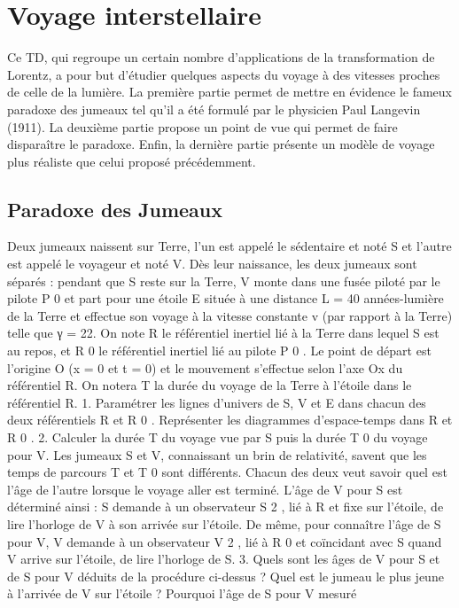 \section{Voyage interstellaire}

Ce TD, qui regroupe un certain nombre d’applications de la transformation de Lorentz, a
pour but d’étudier quelques aspects du voyage à des vitesses proches de celle de la lumière. La
première partie permet de mettre en évidence le fameux paradoxe des jumeaux tel qu’il a été
formulé par le physicien Paul Langevin (1911). La deuxième partie propose un point de vue qui
permet de faire disparaître le paradoxe. Enfin, la dernière partie présente un modèle de voyage
plus réaliste que celui proposé précédemment.
\subsection{Paradoxe des Jumeaux} %
Deux jumeaux naissent sur Terre, l’un est appelé le sédentaire et noté S et l’autre est appelé
le voyageur et noté V. Dès leur naissance, les deux jumeaux sont séparés : pendant que S reste
sur la Terre, V monte dans une fusée piloté par le pilote P 0 et part pour une étoile E située à
une distance L = 40 années-lumière de la Terre et effectue son voyage à la vitesse constante v
(par rapport à la Terre) telle que γ = 22. On note R le référentiel inertiel lié à la Terre dans
lequel S est au repos, et R 0 le référentiel inertiel lié au pilote P 0 . Le point de départ est l’origine
O (x = 0 et t = 0) et le mouvement s’effectue selon l’axe Ox du référentiel R. On notera T la
durée du voyage de la Terre à l’étoile dans le référentiel R.
1. Paramétrer les lignes d’univers de S, V et E dans chacun des deux référentiels R et R 0 .
Représenter les diagrammes d’espace-temps dans R et R 0 .
2. Calculer la durée T du voyage vue par S puis la durée T 0 du voyage pour V.
Les jumeaux S et V, connaissant un brin de relativité, savent que les temps de parcours T et
T 0 sont différents. Chacun des deux veut savoir quel est l’âge de l’autre lorsque le voyage aller
est terminé. L’âge de V pour S est déterminé ainsi : S demande à un observateur S 2 , lié à R et
fixe sur l’étoile, de lire l’horloge de V à son arrivée sur l’étoile. De même, pour connaître l’âge
de S pour V, V demande à un observateur V 2 , lié à R 0 et coïncidant avec S quand V arrive sur
l’étoile, de lire l’horloge de S.
3. Quels sont les âges de V pour S et de S pour V déduits de la procédure ci-dessus ? Quel
est le jumeau le plus jeune à l’arrivée de V sur l’étoile ? Pourquoi l’âge de S pour V mesuré
